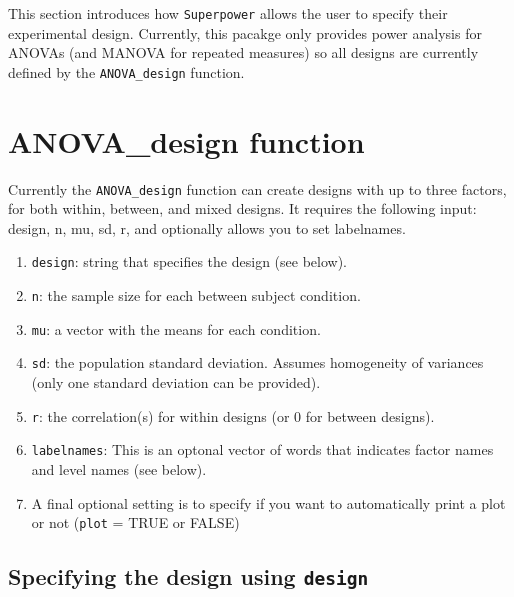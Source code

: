 \documentclass[]{book}
\providecommand{\tightlist}{%
  \setlength{\itemsep}{0pt}\setlength{\parskip}{0pt}}
\begin{document}
This section introduces how \texttt{Superpower} allows the user to specify their experimental design.
Currently, this pacakge only provides power analysis for ANOVAs (and MANOVA for repeated measures) so all designs are currently defined by the \texttt{ANOVA\_design} function.

\hypertarget{anova_design-function}{%
\section{ANOVA\_design function}\label{anova_design-function}}

Currently the \texttt{ANOVA\_design} function can create designs with up to three factors, for both within, between, and mixed designs. It requires the following input: design, n, mu, sd, r, and optionally allows you to set labelnames.

\begin{enumerate}
\def\labelenumi{\arabic{enumi}.}
\tightlist
\item
  \texttt{design}: string that specifies the design (see below).
\item
  \texttt{n}: the sample size for each between subject condition.
\item
  \texttt{mu}: a vector with the means for each condition.
\item
  \texttt{sd}: the population standard deviation. Assumes homogeneity of variances (only one standard deviation can be provided).
\item
  \texttt{r}: the correlation(s) for within designs (or 0 for between designs).
\item
  \texttt{labelnames}: This is an optonal vector of words that indicates factor names and level names (see below).
\item
  A final optional setting is to specify if you want to automatically print a plot or not (\texttt{plot} = TRUE or FALSE)
\end{enumerate}

\hypertarget{specifying-the-design-using-design}{%
\subsection{\texorpdfstring{Specifying the design using \texttt{design}}{Specifying the design using design}}\label{specifying-the-design-using-design}}
\end{document}
